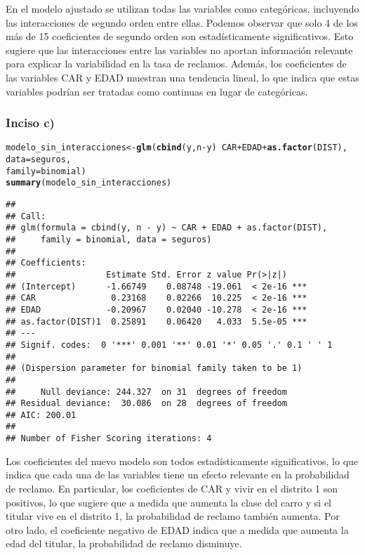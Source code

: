 \documentclass[paper=letter, fontsize=11pt]{scrartcl}\usepackage[]{graphicx}\usepackage[]{xcolor}
\makeatletter
\newcommand{\hlopt}[1]{\textcolor[rgb]{0,0,0}{#1}}%
\newcommand{\hldef}[1]{\textcolor[rgb]{0.345,0.345,0.345}{#1}}%
\newcommand{\hlkwb}[1]{\textcolor[rgb]{0.69,0.353,0.396}{#1}}%
\newcommand{\hlkwc}[1]{\textcolor[rgb]{0.333,0.667,0.333}{#1}}%
\newcommand{\hlkwd}[1]{\textcolor[rgb]{0.737,0.353,0.396}{\textbf{#1}}}%
\newenvironment{kframe}{%
 \def\at@end@of@kframe{}%
 \ifinner\ifhmode%
  \def\at@end@of@kframe{\end{minipage}}%
  \begin{minipage}{\columnwidth}%
 \fi\fi%
 \def\FrameCommand##1{\hskip\@totalleftmargin \hskip-\fboxsep
 \colorbox{shadecolor}{##1}\hskip-\fboxsep
     \hskip-\linewidth \hskip-\@totalleftmargin \hskip\columnwidth}%
 \MakeFramed {\advance\hsize-\width
   \@totalleftmargin\z@ \linewidth\hsize
   \@setminipage}}%
 {\par\unskip\endMakeFramed%
 \at@end@of@kframe}
\newenvironment{knitrout}{}{} %
\numberwithin{equation}{problemcounter} %
\numberwithin{figure}{problemcounter} %
\numberwithin{table}{problemcounter} %
\numberwithin{subsection}{problemcounter}
\makeatother
\begin{document}
En el modelo ajustado se utilizan todas las variables como categóricas, incluyendo las interacciones de segundo orden entre ellas. Podemos observar que solo 4 de los más de 15 coeficientes de segundo orden son estadísticamente significativos. Esto sugiere que las interacciones entre las variables no aportan información relevante para explicar la variabilidad en la tasa de reclamos. Además, los coeficientes de las variables CAR y EDAD muestran una tendencia lineal, lo que indica que estas variables podrían ser tratadas como continuas en lugar de categóricas.

\subsubsection*{Inciso c)}
\begin{knitrout}
\color{fgcolor}\begin{kframe}
\begin{alltt}
\hldef{modelo_sin_interacciones} \hlkwb{<-} \hlkwd{glm}\hldef{(}\hlkwd{cbind}\hldef{(y, n} \hlopt{-} \hldef{y)} \hlopt{~} \hldef{CAR} \hlopt{+} \hldef{EDAD} \hlopt{+} \hlkwd{as.factor}\hldef{(DIST),}
                                 \hlkwc{data} \hldef{= seguros,}
                                 \hlkwc{family} \hldef{= binomial)}
\hlkwd{summary}\hldef{(modelo_sin_interacciones)}
\end{alltt}
\begin{verbatim}
## 
## Call:
## glm(formula = cbind(y, n - y) ~ CAR + EDAD + as.factor(DIST), 
##     family = binomial, data = seguros)
## 
## Coefficients:
##                  Estimate Std. Error z value Pr(>|z|)    
## (Intercept)      -1.66749    0.08748 -19.061  < 2e-16 ***
## CAR               0.23168    0.02266  10.225  < 2e-16 ***
## EDAD             -0.20967    0.02040 -10.278  < 2e-16 ***
## as.factor(DIST)1  0.25891    0.06420   4.033  5.5e-05 ***
## ---
## Signif. codes:  0 '***' 0.001 '**' 0.01 '*' 0.05 '.' 0.1 ' ' 1
## 
## (Dispersion parameter for binomial family taken to be 1)
## 
##     Null deviance: 244.327  on 31  degrees of freedom
## Residual deviance:  30.086  on 28  degrees of freedom
## AIC: 200.01
## 
## Number of Fisher Scoring iterations: 4
\end{verbatim}
\end{kframe}
\end{knitrout}

Los coeficientes del nuevo modelo son todos estadísticamente significativos, lo que indica que cada una de las variables tiene un efecto relevante en la probabilidad de reclamo. En particular, los coeficientes de CAR y vivir en el distrito 1 son positivos, lo que sugiere que a medida que aumenta la clase del carro y si el titular vive en el distrito 1, la probabilidad de reclamo también aumenta. Por otro lado, el coeficiente negativo de EDAD indica que a medida que aumenta la edad del titular, la probabilidad de reclamo disminuye.
\end{document}

